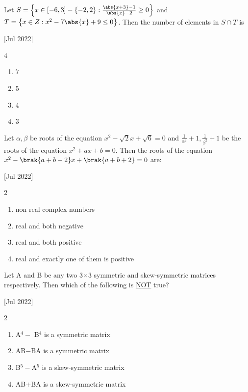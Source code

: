  
    \item Let $S=\left\{ x\in \left[-6,3\right]-\left\{-2,2\right\}:\frac{\abs{x+3}-1}{\abs{x}-2} \geq 0\right\}$ and $T=\left\{ x\in Z:x^2-7\abs{x}+9\leq0\right\}$. Then the number of elements in $S\cap T$ is
    
    \hfill{[Jul 2022]}

        \begin{multicols}{4}
            \begin{enumerate}
                \item $7$
                \item $5$
                \item $4$
                \item $3$
            \end{enumerate}
        \end{multicols}

    \item Let $\alpha,\beta$ be roots of the equation $x^2-\sqrt{2}x+\sqrt{6}=0$ and $\frac{1}{\alpha^2}+1,\frac{1}{\beta^2}+1$ be the roots of the equation $x^2+ax+b=0$. Then the roots of the equation $x^2-\brak{a+b-2}x+\brak{a+b+2}=0$ are:
    
    \hfill{[Jul 2022]}

		\begin{multicols}{2}
			\begin{enumerate}
				\item non-real complex numbers
				\item real and both negative
				\item real and both positive
				\item real and exactly one of them is positive
			\end{enumerate}
		\end{multicols}

    \item Let A and B be any two 3$\times$3 symmetric and skew-symmetric matrices respectively. Then which of the following is \underline{NOT} true?
    
    \hfill{[Jul 2022]}

        \begin{multicols}{2}
            \begin{enumerate}
                \item A$^4 -$ B$^4$ is a symmetric matrix
                \item AB$-$BA is a symmetric matrix
                \item B$^5-$A$^5$ is a skew-symmetric matrix
                \item AB$+$BA is a skew-symmetric matrix
            \end{enumerate}
        \end{multicols}


